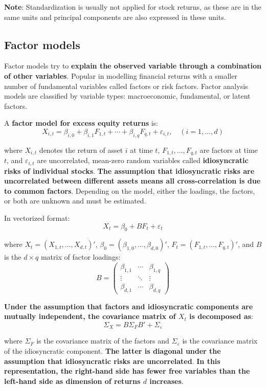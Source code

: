 \documentclass[12pt,a4paper]{article}
\begin{document}
\textbf{Note}: Standardization is usually not applied for stock returns, as these are in the same units and principal components are also expressed in these units.

\subsection{Factor models}

Factor models try to \textbf{explain the observed variable through a combination of other variables}. Popular in modelling financial returns with a smaller number of fundamental variables called factors or risk factors. Factor analysis models are classified by variable types: macroeconomic, fundamental, or latent factors.

A \textbf{factor model for excess equity returns} is:
\[
X_{i,t} = \beta_{i,0} + \beta_{i,1}F_{1,t} + \cdots + \beta_{i,q}F_{q,t} + \varepsilon_{i,t}, \quad (i = 1, \ldots, d)
\]

where $X_{i,t}$ denotes the return of asset $i$ at time $t$, $F_{1,t}, \ldots, F_{q,t}$ are factors at time $t$, and $\varepsilon_{i,t}$ are uncorrelated, mean-zero random variables called \textbf{idiosyncratic risks of individual stocks}. \textbf{The assumption that idiosyncratic risks are uncorrelated between different assets means all cross-correlation is due to common factors}. Depending on the model, either the loadings, the factors, or both are unknown and must be estimated.

In vectorized format:
\[
X_t = \beta_0 + BF_t + \varepsilon_t
\]

where $X_t = (X_{1,t}, \ldots, X_{d,t})'$, $\beta_0 = (\beta_{1,0}, \ldots, \beta_{d,0})'$, $F_t = (F_{1,t}, \ldots, F_{q,t})'$, and $B$ is the $d \times q$ matrix of factor loadings:
\[
B = \begin{pmatrix} \beta_{1,1} & \cdots & \beta_{1,q} \\ \vdots & \ddots & \vdots \\ \beta_{d,1} & \cdots & \beta_{d,q} \end{pmatrix}
\]

\textbf{Under the assumption that factors and idiosyncratic components are mutually independent, the covariance matrix of $X_t$ is decomposed as}:
\[
\Sigma_X = B\Sigma_F B' + \Sigma_\varepsilon
\]

where $\Sigma_F$ is the covariance matrix of the factors and $\Sigma_\varepsilon$ is the covariance matrix of the idiosyncratic component. \textbf{The latter is diagonal under the assumption that idiosyncratic risks are uncorrelated}. \textbf{In this representation, the right-hand side has fewer free variables than the left-hand side as dimension of returns $d$ increases}.
\end{document}
